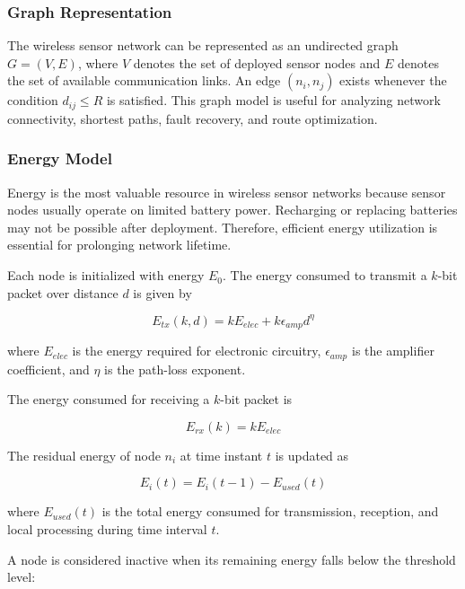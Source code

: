 \documentclass[a4paper,fleqn]{cas-dc}
\numberwithin{equation}{section}
\begin{document}
\subsubsection{Graph Representation}

The wireless sensor network can be represented as an undirected graph $G = (V,E)$, where $V$ denotes the set of deployed sensor nodes and $E$ denotes the set of available communication links. An edge $(n_i,n_j)$ exists whenever the condition $d_{ij} \leq R$ is satisfied. This graph model is useful for analyzing network connectivity, shortest paths, fault recovery, and route optimization.

\subsubsection{Energy Model}

Energy is the most valuable resource in wireless sensor networks because sensor nodes usually operate on limited battery power. Recharging or replacing batteries may not be possible after deployment. Therefore, efficient energy utilization is essential for prolonging network lifetime.

Each node is initialized with energy $E_0$. The energy consumed to transmit a $k$-bit packet over distance $d$ is given by

\begin{equation}
\label{eq:etx}
E_{tx}(k,d)=kE_{elec}+k\epsilon_{amp}d^{\eta}
\end{equation}

where $E_{elec}$ is the energy required for electronic circuitry, $\epsilon_{amp}$ is the amplifier coefficient, and $\eta$ is the path-loss exponent.

The energy consumed for receiving a $k$-bit packet is

\begin{equation}
\label{eq:erx}
E_{rx}(k)=kE_{elec}
\end{equation}

The residual energy of node $n_i$ at time instant $t$ is updated as

\begin{equation}
\label{eq:residual}
E_i(t)=E_i(t-1)-E_{used}(t)
\end{equation}

where $E_{used}(t)$ is the total energy consumed for transmission, reception, and local processing during time interval $t$.

A node is considered inactive when its remaining energy falls below the threshold level:
\end{document}
